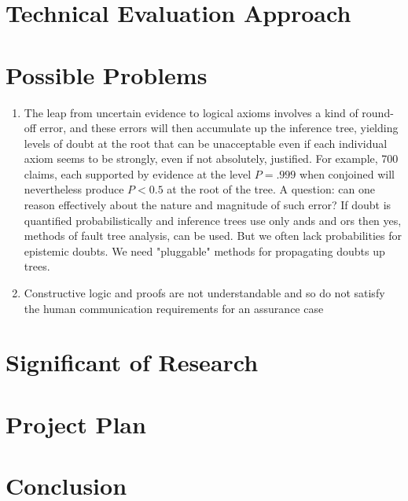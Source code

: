 \documentclass{article} %
\begin{document}
\section{Technical Evaluation Approach}

\section{Possible Problems}

\begin{enumerate}
\item
The leap from uncertain evidence to logical axioms involves a kind of round-off error, and these errors will then accumulate up the inference tree, yielding levels of doubt at the root that can be unacceptable even if each individual axiom seems to be strongly, even if not absolutely, justified. For example, 700 claims, each supported by evidence at the level $P=.999$ when conjoined will nevertheless produce $P <0.5$ at the root of the tree. A question: can one reason effectively about the nature and magnitude of such error? If doubt is quantified probabilistically and inference trees use only ands and ors then yes, methods of fault tree analysis, can be used. But we often lack probabilities for epistemic doubts. We need "pluggable" methods for propagating doubts up trees.
\item
Constructive logic and proofs are not understandable and so do not satisfy the human communication requirements for an assurance case
\end{enumerate}


\section{Significant of Research}

\section{Project Plan}
\section{Conclusion}
\end{document}
